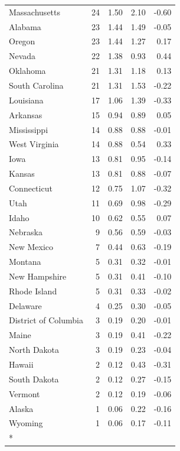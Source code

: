 \begin{longtable}[t]{lrrrr}
Massachusetts & 24 & 1.50 & 2.10 & -0.60\\
Alabama & 23 & 1.44 & 1.49 & -0.05\\
Oregon & 23 & 1.44 & 1.27 & 0.17\\
\addlinespace
Nevada & 22 & 1.38 & 0.93 & 0.44\\
Oklahoma & 21 & 1.31 & 1.18 & 0.13\\
South Carolina & 21 & 1.31 & 1.53 & -0.22\\
Louisiana & 17 & 1.06 & 1.39 & -0.33\\
Arkansas & 15 & 0.94 & 0.89 & 0.05\\
\addlinespace
Mississippi & 14 & 0.88 & 0.88 & -0.01\\
West Virginia & 14 & 0.88 & 0.54 & 0.33\\
Iowa & 13 & 0.81 & 0.95 & -0.14\\
Kansas & 13 & 0.81 & 0.88 & -0.07\\
Connecticut & 12 & 0.75 & 1.07 & -0.32\\
\addlinespace
Utah & 11 & 0.69 & 0.98 & -0.29\\
Idaho & 10 & 0.62 & 0.55 & 0.07\\
Nebraska & 9 & 0.56 & 0.59 & -0.03\\
New Mexico & 7 & 0.44 & 0.63 & -0.19\\
Montana & 5 & 0.31 & 0.32 & -0.01\\
\addlinespace
New Hampshire & 5 & 0.31 & 0.41 & -0.10\\
Rhode Island & 5 & 0.31 & 0.33 & -0.02\\
Delaware & 4 & 0.25 & 0.30 & -0.05\\
District of Columbia & 3 & 0.19 & 0.20 & -0.01\\
Maine & 3 & 0.19 & 0.41 & -0.22\\
\addlinespace
North Dakota & 3 & 0.19 & 0.23 & -0.04\\
Hawaii & 2 & 0.12 & 0.43 & -0.31\\
South Dakota & 2 & 0.12 & 0.27 & -0.15\\
Vermont & 2 & 0.12 & 0.19 & -0.06\\
Alaska & 1 & 0.06 & 0.22 & -0.16\\
\addlinespace
Wyoming & 1 & 0.06 & 0.17 & -0.11\\*
\end{longtable}
\endgroup{}
